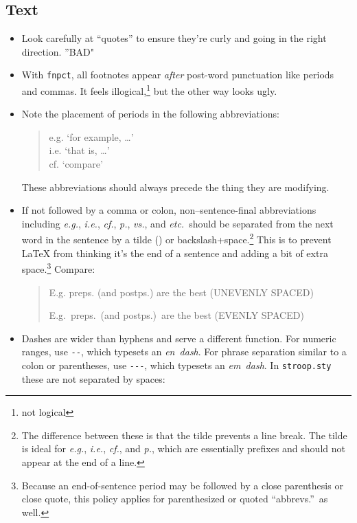 \subsection{Text}

\begin{itemize}
    \item Look carefully at ``quotes'' to ensure they're curly and going in the right direction. ''BAD"
    \item With \texttt{fnpct}, all footnotes appear \emph{after} post-word punctuation like periods and commas.
    It feels illogical,\footnote{not logical}
    but the other way looks ugly.
    \item Note the placement of periods in the following abbreviations:
    \begin{quote}
    e.g. `for example, \dots'\\
    i.e. `that is, \dots'\\
    cf. `compare'
    \end{quote}
    These abbreviations should always precede the thing they are modifying.
    \item If not followed by a comma or colon, non--sentence-final abbreviations including
    \emph{e.g.}, \emph{i.e.}, \emph{cf.}, \emph{p.}, \emph{vs.}, and \emph{etc.}\
    should be separated from the next word in the sentence by a tilde (\texttt{\tat}) or backslash+space.\footnote{The difference between these is that the tilde prevents a line break. The tilde is ideal for \emph{e.g.}, \emph{i.e.}, \emph{cf.}, and \emph{p.}, which are essentially prefixes and should not appear at the end of a line.} This is to prevent \LaTeX{} from thinking it's the end of a sentence and adding a bit of extra space.\footnote{Because an end-of-sentence period may be followed by a close parenthesis or close quote, this policy applies for parenthesized or quoted ``abbrevs.''\ as well.} Compare:

    \begin{quote}
    E.g. preps. (and postps.) are the best (UNEVENLY SPACED)

    E.g.~preps.\ (and postps.)\ are the best (EVENLY SPACED)
    \end{quote}
    \item Dashes are wider than hyphens and serve a different function.
    For numeric ranges, use \verb|--|, which typesets an \emph{en~dash}.
    For phrase separation similar to a colon or parentheses, use \verb|---|,
    which typesets an \emph{em~dash}. In \verb|stroop.sty| these are not separated by spaces:


\end{itemize}
